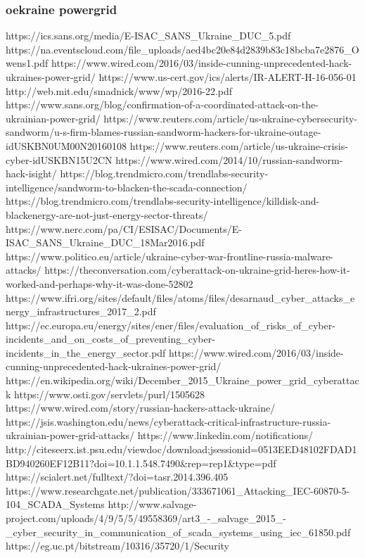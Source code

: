 \subsubsection{oekraine powergrid}

https://ics.sans.org/media/E-ISAC_SANS_Ukraine_DUC_5.pdf
https://na.eventscloud.com/file_uploads/aed4bc20e84d2839b83c18bcba7e2876_Owens1.pdf
https://www.wired.com/2016/03/inside-cunning-unprecedented-hack-ukraines-power-grid/
https://www.us-cert.gov/ics/alerts/IR-ALERT-H-16-056-01
http://web.mit.edu/smadnick/www/wp/2016-22.pdf
https://www.sans.org/blog/confirmation-of-a-coordinated-attack-on-the-ukrainian-power-grid/
https://www.reuters.com/article/us-ukraine-cybersecurity-sandworm/u-s-firm-blames-russian-sandworm-hackers-for-ukraine-outage-idUSKBN0UM00N20160108
https://www.reuters.com/article/us-ukraine-crisis-cyber-idUSKBN15U2CN
https://www.wired.com/2014/10/russian-sandworm-hack-isight/
https://blog.trendmicro.com/trendlabs-security-intelligence/sandworm-to-blacken-the-scada-connection/
https://blog.trendmicro.com/trendlabs-security-intelligence/killdisk-and-blackenergy-are-not-just-energy-sector-threats/
https://www.nerc.com/pa/CI/ESISAC/Documents/E-ISAC_SANS_Ukraine_DUC_18Mar2016.pdf
https://www.politico.eu/article/ukraine-cyber-war-frontline-russia-malware-attacks/
https://theconversation.com/cyberattack-on-ukraine-grid-heres-how-it-worked-and-perhaps-why-it-was-done-52802
https://www.ifri.org/sites/default/files/atoms/files/desarnaud_cyber_attacks_energy_infrastructures_2017_2.pdf
https://ec.europa.eu/energy/sites/ener/files/evaluation_of_risks_of_cyber-incidents_and_on_costs_of_preventing_cyber-incidents_in_the_energy_sector.pdf
https://www.wired.com/2016/03/inside-cunning-unprecedented-hack-ukraines-power-grid/
https://en.wikipedia.org/wiki/December_2015_Ukraine_power_grid_cyberattack
https://www.osti.gov/servlets/purl/1505628
https://www.wired.com/story/russian-hackers-attack-ukraine/
https://jsis.washington.edu/news/cyberattack-critical-infrastructure-russia-ukrainian-power-grid-attacks/
https://www.linkedin.com/notifications/
http://citeseerx.ist.psu.edu/viewdoc/download;jsessionid=0513EED48102FDAD1BD940260EF12B11?doi=10.1.1.548.7490&rep=rep1&type=pdf
https://scialert.net/fulltext/?doi=tasr.2014.396.405
https://www.researchgate.net/publication/333671061_Attacking_IEC-60870-5-104_SCADA_Systems
http://www.salvage-project.com/uploads/4/9/5/5/49558369/art3_-_salvage_2015_-_cyber_security_in_communication_of_scada_systems_using_iec_61850.pdf
https://eg.uc.pt/bitstream/10316/35720/1/Security%

